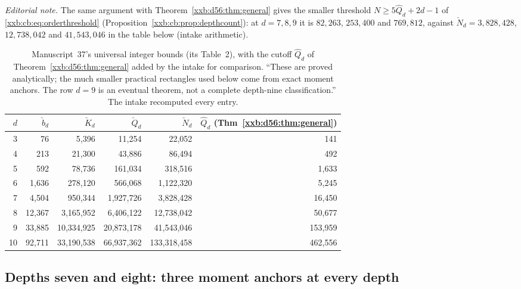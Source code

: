 \documentclass[11pt,a4paper]{article}
\numberwithin{equation}{section}
\theoremstyle{definition}
\theoremstyle{remark}
\theoremstyle{plain}
\begin{document}
\emph{Editorial note.}  The same argument with
Theorem~\ref{xxb:d56:thm:general} gives the smaller threshold
$N\ge5\widehat Q_d+2d-1$ of \eqref{xxb:cb:eq:orderthreshold}
(Proposition~\ref{xxb:cb:prop:depthcount}): at $d=7,8,9$ it is $82{,}263$,
$253{,}400$ and $769{,}812$, against $\check N_d=3{,}828{,}428$, $12{,}738{,}042$ and
$41{,}543{,}046$ in the table below (intake arithmetic).

\begingroup
\renewcommand{\thetable}{\thesection.C}%
\renewcommand{\theHtable}{xxb.d78.\thesection.C}%
\begin{table}[!htbp]
\centering\small
\begin{tabular}{@{}rrrrrr@{}}
\toprule
$d$ & $\check b_d$ & $\check K_d$ & $\check Q_d$ & $\check N_d$ & $\widehat Q_d$ (Thm~\ref{xxb:d56:thm:general})\\
\midrule
3 & 76 & 5,396 & 11,254 & 22,052 & 141\\
4 & 213 & 21,300 & 43,886 & 86,494 & 492\\
5 & 592 & 78,736 & 161,034 & 318,516 & 1,633\\
6 & 1,636 & 278,120 & 566,068 & 1,122,320 & 5,245\\
7 & 4,504 & 950,344 & 1,927,726 & 3,828,428 & 16,450\\
8 & 12,367 & 3,165,952 & 6,406,122 & 12,738,042 & 50,677\\
9 & 33,885 & 10,334,925 & 20,873,178 & 41,543,046 & 153,959\\
10 & 92,711 & 33,190,538 & 66,937,362 & 133,318,458 & 462,556\\
\bottomrule
\end{tabular}
\caption{Manuscript~37's universal integer bounds (its Table~2), with the
cutoff $\widehat Q_d$ of Theorem~\ref{xxb:d56:thm:general} added by the intake
for comparison.  ``These are proved analytically; the much smaller practical
rectangles used below come from exact moment anchors.  The row $d=9$ is an
eventual theorem, not a complete depth-nine classification.''  The intake
recomputed every entry.}\label{xxb:d78:tab:universal}
\end{table}
\endgroup
\addtocounter{table}{-1}

\subsection{Depths seven and eight: three moment anchors at every depth}\label{xxb:d78:sec:anchors}
\end{document}
